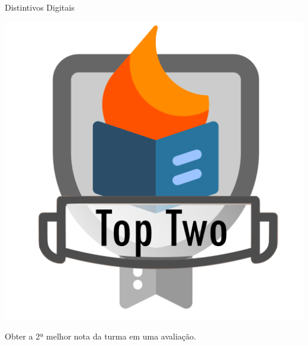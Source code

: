 \documentclass[xcolor=dvipsnames,table]{beamer}
\begin{document}
	\begin{frame}{Distintivos Digitais}
		\begin{block}{}
			\begin{center}
				\includegraphics[height=.65\textheight]{images/badges/top-two.png}
			\end{center}		
			Obter a 2ª melhor nota da turma em uma avaliação. 
		\end{block}
	\end{frame}
	
\end{document}
